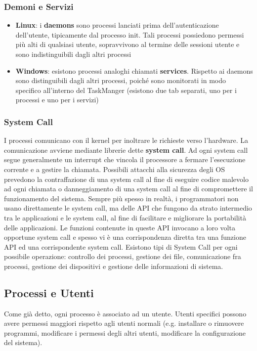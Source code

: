 \subsubsection{Demoni e Servizi}
\begin{itemize}
  \item \textbf{Linux}: i \textbf{daemons} sono processi lanciati prima dell'autenticazione dell'utente, tipicamente dal processo init. Tali processi possiedono permessi più alti di qualsiasi utente, sopravvivono al termine delle sessioni utente e sono indistinguibili dagli altri processi
  \item \textbf{Windows}: esistono processi analoghi chiamati \textbf{services}. Rispetto ai daemons sono distinguibili dagli altri processi, poiché sono monitorati in modo specifico all'interno del TaskManger (esistono due tab separati, uno per i processi e uno per i servizi)
\end{itemize}

\subsubsection{System Call}
I processi comunicano con il kernel per inoltrare le richieste verso l'hardware. La comunicazione avviene mediante librerie dette \textbf{system call}. Ad ogni system call segue generalmente un interrupt che vincola il processore a fermare l'esecuzione corrente e a gestire la chiamata. Possibili attacchi alla sicurezza degli OS prevedono la contraffazione di una system call al fine di eseguire codice malevolo ad ogni chiamata o danneggiamento di una system call al fine di compromettere il funzionamento del sistema. Sempre più spesso in realtà, i programmatori non usano direttamente le system call, ma delle API che fungono da strato intermedio tra le applicazioni e le system call, al fine di facilitare e migliorare la portabilità delle applicazioni. Le funzioni contenute in queste API invocano a loro volta opportune system call e spesso vi è una corrispondenza diretta tra una funzione API ed una corrispondente system call. Esistono tipi di System Call per ogni possibile operazione: controllo dei processi, gestione dei file, comunicazione fra processi, gestione dei dispositivi e gestione delle informazioni di sistema.

\subsection{Processi e Utenti}
Come già detto, ogni processo è associato ad un utente. Utenti specifici possono avere permessi maggiori rispetto agli utenti normali (e.g. installare o rimuovere programmi, modificare i permessi degli altri utenti, modificare la configurazione del sistema). \newline 

